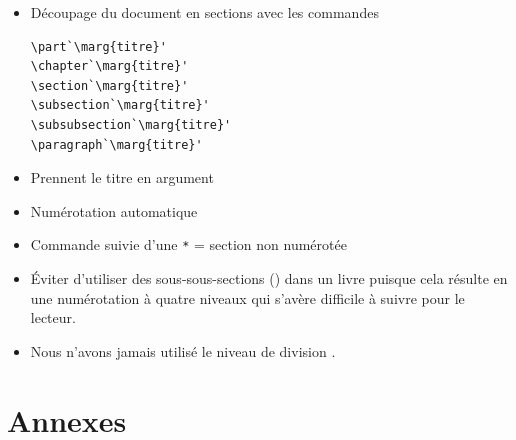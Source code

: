 \begin{itemize}
\item Découpage du document en sections avec les commandes
\begin{lstlisting}
\part`\marg{titre}'
\chapter`\marg{titre}'
\section`\marg{titre}'
\subsection`\marg{titre}'
\subsubsection`\marg{titre}'
\paragraph`\marg{titre}'
\end{lstlisting}
\item Prennent le titre en argument
\item Numérotation automatique
\item Commande suivie d'une \verb=*= = section non numérotée
\item Éviter d'utiliser des sous-sous-sections
  (\cmdprint{\subsubsection}) dans un livre puisque cela résulte en
  une numérotation à quatre niveaux qui s'avère difficile à suivre pour le
  lecteur.
\item Nous n'avons jamais utilisé le niveau de division \cmdprint{\paragraph}.
\end{itemize}


\section{Annexes}

